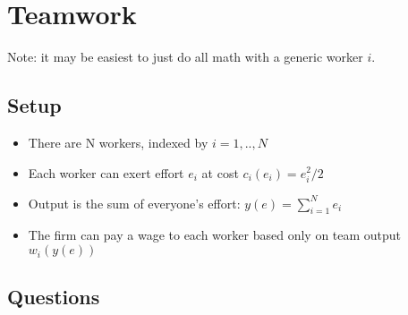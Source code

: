 \documentclass{article}
\begin{document}
\section{Teamwork}

Note: it may be easiest to just do all math with a generic worker $i$.

\subsection{Setup}
\begin{itemize}
    \item There are N workers, indexed by $i=1,..,N$
    \item Each worker can exert effort $e_i$ at cost $c_i(e_i)=e_i^2/2$
    \item Output is the sum of everyone's effort: $y(e)=\sum_{i=1}^N e_i$
    \item The firm can pay a wage to each worker based only on team output $w_i(y(e))$
\end{itemize}

\subsection{Questions}
\end{document}
